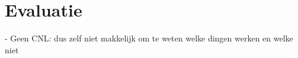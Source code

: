 \chapter{Evaluatie}

- Geen CNL: dus zelf niet makkelijk om te weten welke dingen werken en welke niet
